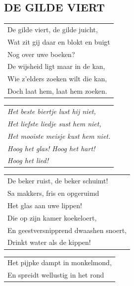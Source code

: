 \documentclass{article}
\begin{document}
\subsection*{DE GILDE VIERT}
\begin{flushleft}
\begin{tabularx}{0.8\textwidth} {
   >{\raggedright\arraybackslash}X}
   De gilde viert, de gilde juicht,\\
Wat zit gij daar en blokt en buigt\\
Nog over uwe boeken?\\
De wijsheid ligt maar in de kan,\\
Wie z’elders zoeken wilt die kan,\\
Doch laat hem, laat hem zoeken.\\
\end{tabularx}
\end{flushleft}\begin{flushleft}
\begin{tabularx}{0.8\textwidth} {
   >{\raggedright\arraybackslash}X}
   \textit{Het beste biertje lust hij niet,}\\
\textit{Het liefste liedje sust hem niet,}\\
\textit{Het mooiste meisje kust hem niet.}\\
\textit{Hoog het glas! Hoog het hart!}\\
\textit{Hoog het lied!}\\
\end{tabularx}
\end{flushleft}\begin{flushleft}
\begin{tabularx}{0.8\textwidth} {
   >{\raggedright\arraybackslash}X}
De beker ruist, de beker schuimt!\\
Sa makkers, fris en opgeruimd\\
Het glas aan uwe lippen!\\
Die op zijn kamer koekeloert,\\
En geestversnipprend dwaashen snoert,\\
Drinkt water als de kippen!\\
\end{tabularx}
\end{flushleft}\begin{flushleft}
\begin{tabularx}{0.8\textwidth} {
   >{\raggedright\arraybackslash}X}
Het pijpke dampt in monkelmond,\\
En spreidt wellustig in het rond\\

\end{tabularx}
\end{flushleft}
\end{document}
